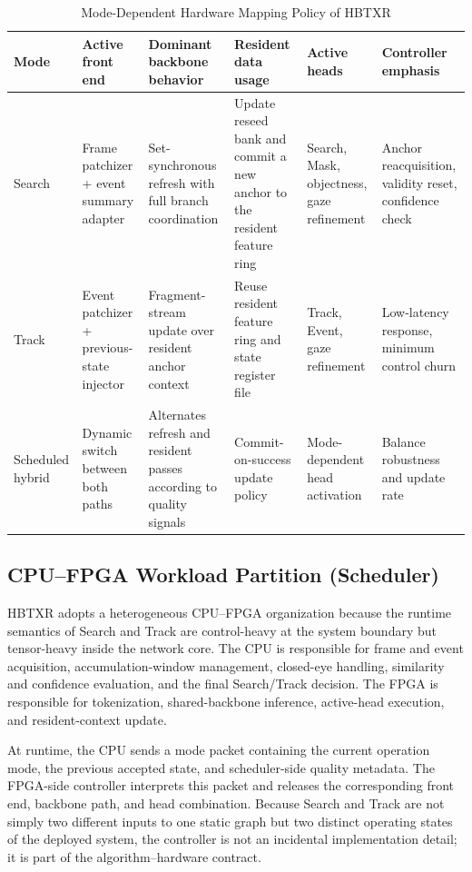 \documentclass[journal]{IEEEtran}
\begin{document}
\begin{table}[t]
\caption{Mode-Dependent Hardware Mapping Policy of HBTXR}
\label{tab:mapping}
\centering
\footnotesize
\begin{tabular}{p{}p{}p{}p{}p{}p{}}
\toprule
Mode & Active front end & Dominant backbone behavior & Resident data usage & Active heads & Controller emphasis \\
\midrule
Search & Frame patchizer + event summary adapter & Set-synchronous refresh with full branch coordination & Update reseed bank and commit a new anchor to the resident feature ring & Search, Mask, objectness, gaze refinement & Anchor reacquisition, validity reset, confidence check \\
Track & Event patchizer + previous-state injector & Fragment-stream update over resident anchor context & Reuse resident feature ring and state register file & Track, Event, gaze refinement & Low-latency response, minimum control churn \\
Scheduled hybrid & Dynamic switch between both paths & Alternates refresh and resident passes according to quality signals & Commit-on-success update policy & Mode-dependent head activation & Balance robustness and update rate \\
\bottomrule
\end{tabular}
\end{table}

\subsection{CPU--FPGA Workload Partition (Scheduler)}
HBTXR adopts a heterogeneous CPU--FPGA organization because the runtime semantics of Search and Track are control-heavy at the system boundary but tensor-heavy inside the network core. The CPU is responsible for frame and event acquisition, accumulation-window management, closed-eye handling, similarity and confidence evaluation, and the final Search/Track decision. The FPGA is responsible for tokenization, shared-backbone inference, active-head execution, and resident-context update.

At runtime, the CPU sends a mode packet containing the current operation mode, the previous accepted state, and scheduler-side quality metadata. The FPGA-side controller interprets this packet and releases the corresponding front end, backbone path, and head combination. Because Search and Track are not simply two different inputs to one static graph but two distinct operating states of the deployed system, the controller is not an incidental implementation detail; it is part of the algorithm--hardware contract.
\end{document}
